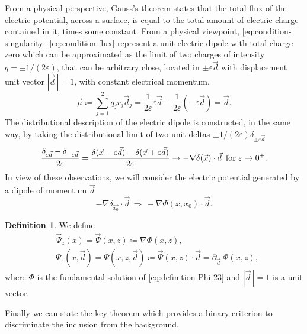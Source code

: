 \documentclass[10pt, a4paper, twoside, openright]{book}
\theoremstyle{definition}
\newtheorem{definition}[subsection]{Definition}
\theoremstyle{plain}
\theoremstyle{plain}
\theoremstyle{plain}
\theoremstyle{plain}
\theoremstyle{plain}
\theoremstyle{plain}
\theoremstyle{plain}
\theoremstyle{plain}
\let\epsilon\varepsilon
\begin{document}
From a physical perspective, Gauss's theorem states that the total flux of the electric potential, across a surface, is equal to the total amount of electric charge contained in it, times some constant.
From a physical viewpoint, \eqref{eq:condition-singularity}--\eqref{eq:condition-flux} represent a unit electric dipole 
with total charge zero which can be approximated as the limit of two charges 
of intensity $q=\pm1/(2\epsilon)$, that can be arbitrary close, located in $\pm\epsilon\vec{d}$ with displacement unit vector $|\vec{d}\,|=1$, with constant electrical momentum.
\begin{equation}
 \vec{\mu}\coloneqq \sum_{j=1}^2 q_jr_j\vec{d}_j=\dfrac{1}{2\epsilon}\epsilon\vec{d} -\dfrac{1}{2\epsilon}(-\epsilon\vec{d})=\vec{d}.
\end{equation}
The distributional description of the electric dipole is constructed, in the same way, by taking the distributional limit of two unit deltas $\pm1/(2\epsilon)\delta_{\pm\epsilon\vec{d}}\,$
\begin{equation}
 \dfrac{\delta_{\epsilon\vec{d}} - \delta_{-\epsilon\vec{d}}}{2\epsilon}=\dfrac{\delta(\vec{x} - \epsilon\vec{d}) - \delta(\vec{x}+\epsilon\vec{d})}{2\epsilon}\to -\nabla\delta(\vec{x})\cdot\vec{d}\, \textup{ for }\epsilon\to0^+.
\end{equation}
In view of these observations, we will consider the electric potential generated by a dipole of momentum $\vec{d}$
\begin{equation}
 -\nabla\delta_{\vec{x_0}}\cdot\vec{d}\, \Longrightarrow\, -\nabla\Phi(x,x_0) \cdot \vec{d}.
\end{equation}
\begin{definition}
\label{def:fund-sol-deriv-Psi}
We define
\begin{align}
 &\vec{\Psi}_z(x) = \vec{\Psi}(x,z) \coloneqq \nabla\Phi(x,z),\\
 &\Psi_z(x,\vec{d})= \Psi(x,z,\vec{d}) \coloneqq \vec{\Psi}(x,z)\cdot \vec{d} = \partial_{\vec{d}\,\,}\Phi(x,z),
\end{align}
where $\Phi$ is the fundamental solution of \eqref{eq:definition-Phi-23}
and $|\vec{d}\,|=1$ is a unit vector.
\end{definition}
Finally we can state the key theorem which provides a binary criterion to discriminate the inclusion from the background.
\end{document}
